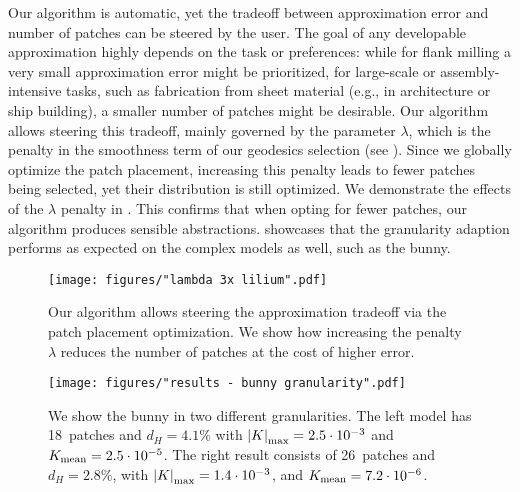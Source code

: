 Our algorithm is automatic, yet the tradeoff between approximation error and number of patches can be steered by the user. The goal of any developable approximation highly depends on the task or preferences: while for flank milling a very small approximation error might be prioritized, for large-scale or assembly-intensive tasks, such as fabrication from sheet material (e.g., in architecture or ship building), a smaller number of patches might be desirable. Our algorithm allows steering this tradeoff, mainly governed by the parameter $\lambda$, which is the penalty in the smoothness term of our geodesics selection (see ). Since we globally optimize the patch placement, increasing this penalty leads to fewer patches being selected, yet their distribution is still optimized. We demonstrate the effects of the $\lambda$ penalty in . This confirms that when opting for fewer patches, our algorithm produces sensible abstractions. 
 showcases that the granularity adaption performs as expected on the complex models as well, such as the bunny. 


\begin{figure} 
\centering
\noindent\texttt{[image: figures/"lambda 3x lilium".pdf]}
\caption{
    Our algorithm allows steering the approximation tradeoff via the patch placement optimization. We show how increasing the penalty~$\lambda$ reduces the number of patches at the cost of higher error.
    \label{fig:results_lilium_lambda}}
\end{figure}

\begin{figure} 
\centering
\noindent\texttt{[image: figures/"results - bunny granularity".pdf]}
\caption{
     We show the bunny in two different granularities. The left model has 18~patches and $d_H = 4.1\%$ with $ \left\vert K\right\vert_\text{max} = 2.5\cdot 10^{-3} $ and $ K_\text{mean} = 2.5\cdot 10^{-5} $. The right result consists of 26~patches and $d_H = 2.8\% $, with $ \left\vert K\right\vert_\text{max} = 1.4\cdot 10^{-3} $, and $ K_\text{mean} = 7.2\cdot 10^{-6} $. 
    \label{fig:results_bunny_granularity}}
\end{figure}

